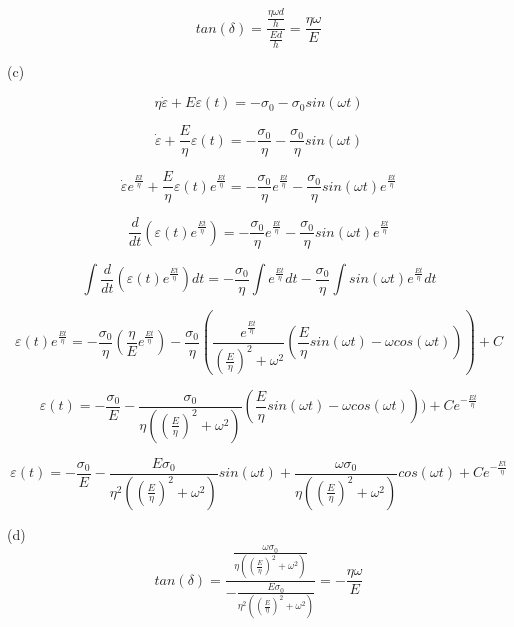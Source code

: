 \documentclass{article}
\begin{document}
\begin{equation*}
    tan(\delta) = \frac{\frac{\eta \omega d}{h}}{\frac{Ed}{h}} = \frac{\eta \omega}{E}
\end{equation*}

\newpage


(c)

\begin{equation*}
    \eta \dot\varepsilon + E \varepsilon(t) = -\sigma_0 - \sigma_0 sin(\omega t)
\end{equation*}

\begin{equation*}
    \dot\varepsilon + \frac{E}{\eta} \varepsilon(t) = -\frac{\sigma_0}{\eta} - \frac{\sigma_0}{\eta} sin(\omega t)
\end{equation*}

\begin{equation*}
    \dot\varepsilon e^\frac{Et}{\eta} + \frac{E}{\eta} \varepsilon(t) e^\frac{Et}{\eta} = - \frac{\sigma_0}{\eta}e^\frac{Et}{\eta} - \frac{\sigma_0}{\eta} sin(\omega t)e^\frac{Et}{\eta}
\end{equation*}

\begin{equation*}
    \frac{d}{dt} (\varepsilon(t) e^\frac{Et}{\eta}) = -\frac{\sigma_0}{\eta}e^\frac{Et}{\eta} - \frac{\sigma_0}{\eta} sin(\omega t)e^\frac{Et}{\eta}
\end{equation*}

\begin{equation*}
    \int \frac{d}{dt} (\varepsilon(t) e^\frac{Et}{\eta}) dt = -\frac{\sigma_0}{\eta} \int e^\frac{Et}{\eta} dt - \frac{\sigma_0}{\eta} \int sin(\omega t)e^\frac{Et}{\eta} dt
\end{equation*}

\begin{equation*}
    \varepsilon(t) e^\frac{Et}{\eta} = -\frac{\sigma_0}{\eta}(\frac{\eta}{E} e^{\frac{Et}{\eta}}) - \frac{\sigma_0}{\eta} (\frac{e^{\frac{Et}{\eta}}}{(\frac{E}{\eta})^2 + \omega^2} (\frac{E}{\eta} sin(\omega t) - \omega cos(\omega t))) + C
\end{equation*}

\begin{equation*}
    \varepsilon(t) = -\frac{\sigma_0}{E} - \frac{\sigma_0}{\eta ((\frac{E}{\eta})^2 + \omega^2)} (\frac{E}{\eta} sin(\omega t) - \omega cos(\omega t))) + C e^{-{\frac{Et}{\eta}}}
\end{equation*}

\begin{equation*}
    \varepsilon(t) = -\frac{\sigma_0}{E} - \frac{E \sigma_0}{\eta^2 ((\frac{E}{\eta})^2 + \omega^2)} sin(\omega t) + \frac{\omega \sigma_0}{\eta ((\frac{E}{\eta})^2 + \omega^2)} cos(\omega t) + C e^{-{\frac{Et}{\eta}}}
\end{equation*}

\bigskip

(d)
\begin{equation*}
    tan(\delta) = \frac{\frac{\omega \sigma_0}{\eta ((\frac{E}{\eta})^2 + \omega^2)}}{-\frac{E \sigma_0}{\eta^2 ((\frac{E}{\eta})^2 + \omega^2)}} = -\frac{\eta \omega}{E}
\end{equation*}
\end{document}
